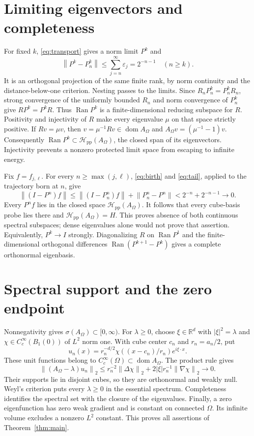 \documentclass[11pt]{article}
\newcommand{\R}{\mathbb R}
\newcommand{\Ran}{\operatorname{Ran}}
\newcommand{\dom}{\operatorname{dom}}
\newcommand{\norm}[1]{\left\lVert #1\right\rVert}
\newcommand{\Hpp}{\mathcal H_{\mathrm{pp}}}
\begin{document}
\section{Limiting eigenvectors and completeness}

For fixed $k$, \eqref{eq:transport} gives a norm limit $P^k$ and
\begin{equation}\label{eq:tail}
 \norm{P^k-P_n^k}\le\sum_{j=n}^\infty\varepsilon_j
       =2^{-n-1}\quad(n\ge k).
\end{equation}
It is an orthogonal projection of the same finite rank, by norm
continuity and the distance-below-one criterion.
Nesting passes to the limits.
Since $R_nP_n^k=P_n^kR_n$, strong convergence of the uniformly bounded
$R_n$ and norm convergence of $P_n^k$ give
$RP^k=P^kR$.
Thus $\Ran P^k$ is a finite-dimensional reducing subspace for $R$.
Positivity and injectivity of $R$ make every eigenvalue $\mu$ on that
space strictly positive. If $Rv=\mu v$, then
$v=\mu^{-1}Rv\in\dom A_\Omega$ and
$A_\Omega v=(\mu^{-1}-1)v$.
Consequently $\Ran P^k\subset\Hpp(A_\Omega)$, the closed span of its
eigenvectors. Injectivity prevents a nonzero protected limit space from
escaping to infinite energy.

Fix $f=f_{j,\ell}$. For every $n\ge\max(j,\ell)$,
\eqref{eq:birth} and \eqref{eq:tail}, applied to the trajectory born at $n$,
give
\[
 \norm{(I-P^n)f}
 \le\norm{(I-P_n^n)f}+\norm{P_n^n-P^n}
 <2^{-n}+2^{-n-1}\longrightarrow0.
\]
Every $P^nf$ lies in the closed space $\Hpp(A_\Omega)$.
It follows that every cube-basis probe lies there and
$\Hpp(A_\Omega)=H$.
This proves absence of both continuous spectral subspaces; dense
eigenvalues alone would not prove that assertion.
Equivalently, $P^k\to I$ strongly. Diagonalizing $R$ on $\Ran P^1$ and
the finite-dimensional orthogonal differences
$\Ran(P^{k+1}-P^k)$ gives a complete orthonormal eigenbasis.

\section{Spectral support and the zero endpoint}

Nonnegativity gives $\sigma(A_\Omega)\subset[0,\infty)$.
For $\lambda\ge0$, choose $\xi\in\R^d$ with $|\xi|^2=\lambda$ and
$\chi\in C_c^\infty(B_1(0))$ of $L^2$ norm one. With cube center $c_n$
and $r_n=a_n/2$, put
\[
 u_n(x)=r_n^{-d/2}\chi((x-c_n)/r_n)e^{i\xi\cdot x}.
\]
These unit functions belong to $C_c^\infty(\Omega)\subset\dom A_\Omega$.
The product rule gives
\[
 \norm{(A_\Omega-\lambda)u_n}_2
 \le r_n^{-2}\norm{\Delta\chi}_2
       +2|\xi|r_n^{-1}\norm{\nabla\chi}_2\longrightarrow0.
\]
Their supports lie in disjoint cubes, so they are orthonormal and weakly
null. Weyl's criterion puts every $\lambda\ge0$ in the essential spectrum.
Completeness identifies the spectral set with the closure of the
eigenvalues. Finally, a zero eigenfunction has zero weak gradient and is
constant on connected $\Omega$. Its infinite volume excludes a nonzero
$L^2$ constant. This proves all assertions of Theorem~\ref{thm:main}.
\end{document}
